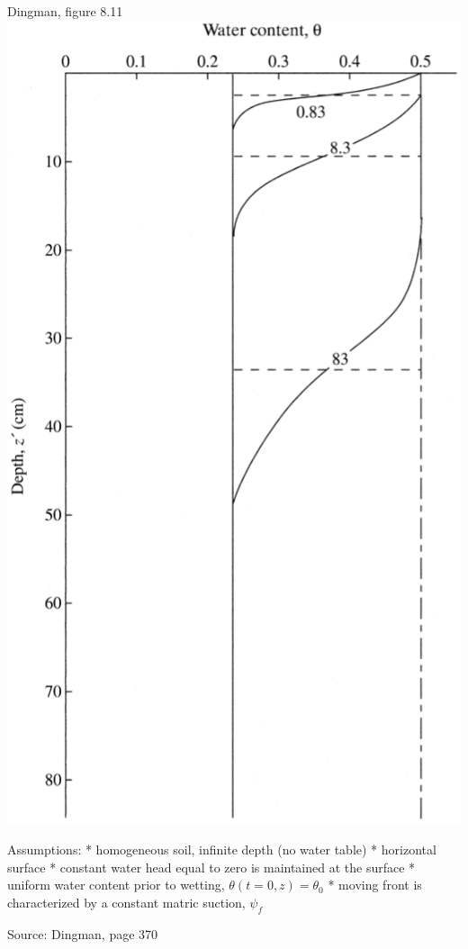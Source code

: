 \documentclass[
  letterpaper,
  DIV=11,
  numbers=noendperiod]{scrreprt}
\begin{document}
Dingman, figure 8.11
\includegraphics{archive/figures/dingman-figure8.11.png}

Assumptions: * homogeneous soil, infinite depth (no water table) *
horizontal surface * constant water head equal to zero is maintained at
the surface * uniform water content prior to wetting,
\(\theta(t=0,z)=\theta_0\) * moving front is characterized by a constant
matric suction, \(\psi_f\)

Source: Dingman, page 370
\end{document}
